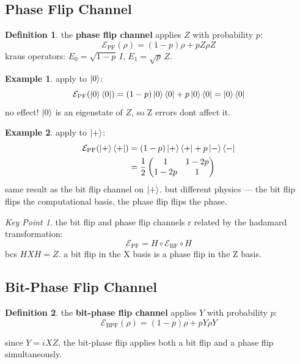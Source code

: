 \documentclass[11pt,a4paper]{article}
\theoremstyle{definition}
\newtheorem{definition}{Definition}[section]
\newtheorem{example}{Example}[section]
\theoremstyle{remark}
\newtheorem*{keypoint}{Key Point}
\begin{document}
\subsection{Phase Flip Channel}

\begin{definition}
the \textbf{phase flip channel} applies $Z$ with probability $p$:
\[
\mathcal{E}_{\text{PF}}(\rho) = (1-p)\rho + p Z\rho Z
\]
kraus operators: $E_0 = \sqrt{1-p}\,I$, $E_1 = \sqrt{p}\,Z$.
\end{definition}

\begin{example}
apply to $\ket{0}$:
\[
\mathcal{E}_{\text{PF}}(\ket{0}\bra{0}) = (1-p)\ket{0}\bra{0} + p\ket{0}\bra{0} = \ket{0}\bra{0}
\]
no effect! $\ket{0}$ is an eigenstate of $Z$, so Z errors dont affect it.
\end{example}

\begin{example}
apply to $\ket{+}$:
\begin{align}
\mathcal{E}_{\text{PF}}(\ket{+}\bra{+}) &= (1-p)\ket{+}\bra{+} + p\ket{-}\bra{-} \\
&= \frac{1}{2}\begin{pmatrix} 1 & 1-2p \\ 1-2p & 1 \end{pmatrix}
\end{align}
same result as the bit flip channel on $\ket{+}$. but different physics --- the bit flip flips the computational basis, the phase flip flips the phase.
\end{example}

\begin{keypoint}
the bit flip and phase flip channels r related by the hadamard transformation:
\[
\mathcal{E}_{\text{PF}} = H \circ \mathcal{E}_{\text{BF}} \circ H
\]
bcs $HXH = Z$. a bit flip in the X basis is a phase flip in the Z basis.
\end{keypoint}

\subsection{Bit-Phase Flip Channel}

\begin{definition}
the \textbf{bit-phase flip channel} applies $Y$ with probability $p$:
\[
\mathcal{E}_{\text{BPF}}(\rho) = (1-p)\rho + p Y\rho Y
\]
\end{definition}

since $Y = iXZ$, the bit-phase flip applies both a bit flip and a phase flip simultaneously.
\end{document}

